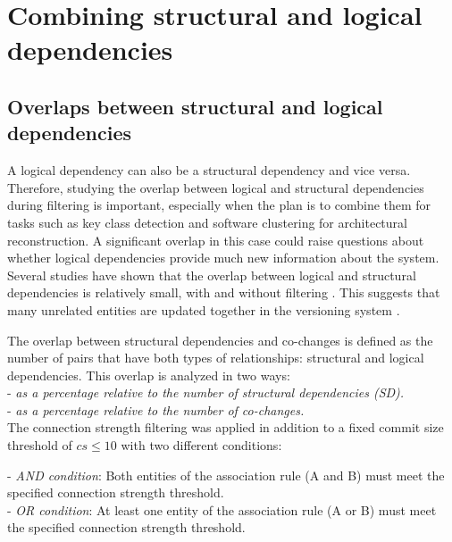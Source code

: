 
\chapter{Combining structural and logical dependencies}
\label{chap:combining_dependencies}


\section{Overlaps between structural and logical dependencies}
\label{sec:dependency_overlaps}

\hspace{4em}A logical dependency can also be a structural dependency and vice versa. Therefore, studying the overlap between logical and structural dependencies during filtering is important, especially when the plan is to combine them for tasks such as key class detection and software clustering for architectural reconstruction. A significant overlap in this case could raise questions about whether logical dependencies provide much new information about the system.
Several studies have shown that the overlap between logical and structural dependencies is relatively small, with and without filtering \cite{DBLP:journals/jss/AjienkaC17}. This suggests that many unrelated entities are updated together in the versioning system \cite{enase19, cluster-access}.

The overlap between structural dependencies and co-changes is defined as the number of pairs that have both types of relationships: structural and logical dependencies. This overlap is analyzed in two ways:\\
\hspace{-4em}- \textit{as a percentage relative to the number of structural dependencies (SD).}\\
- \textit{as a percentage relative to the number of co-changes.}\\

The connection strength filtering was applied in addition to a fixed commit size threshold of \(cs \leq 10\) with two different conditions:   

\hspace{-4em}- \textit{AND condition}: Both entities of the association rule (A and B) must meet the specified connection strength threshold. \\  
- \textit{OR condition}: At least one entity of the association rule (A or B) must meet the specified connection strength threshold.

